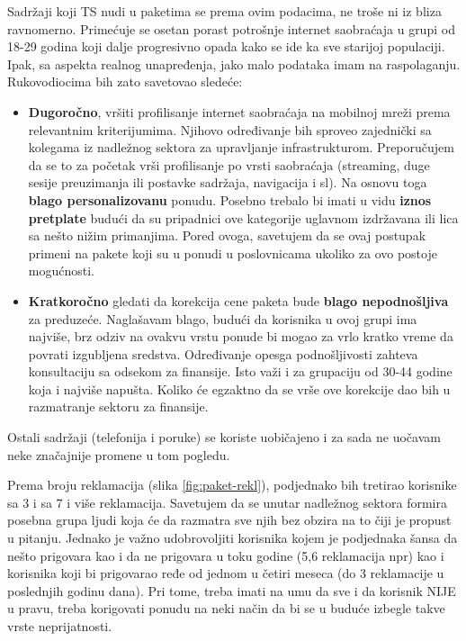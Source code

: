 \documentclass[a4paper,12pt]{article}
\begin{document}
    Sadržaji koji TS nudi u paketima se prema ovim podacima, ne troše ni iz bliza ravnomerno. Primećuje se osetan porast potrošnje internet saobraćaja u grupi od 18-29
    godina koji dalje progresivno opada kako se ide ka sve starijoj populaciji. Ipak, sa aspekta realnog unapređenja, jako malo podataka imam na raspolaganju.
    Rukovodiocima bih zato savetovao sledeće:
    \begin{itemize}
        \item {\textbf{Dugoročno}, vršiti profilisanje internet saobraćaja na mobilnoj mreži prema relevantnim kriterijumima. Njihovo određivanje bih
        sproveo zajednički sa kolegama iz nadležnog sektora za upravljanje infrastrukturom. Preporučujem da se to za početak vrši
        profilisanje po vrsti saobraćaja (streaming, duge sesije preuzimanja ili postavke sadržaja, navigacija i sl). Na osnovu toga
        \textbf{blago personalizovanu} ponudu. Posebno trebalo bi imati u vidu \textbf{iznos pretplate} budući da su pripadnici ove kategorije
        uglavnom izdržavana ili lica sa nešto nižim primanjima. Pored ovoga, savetujem da se ovaj postupak primeni na pakete koji su u ponudi u poslovnicama ukoliko
        za ovo postoje mogućnosti. }
        \item {\textbf{Kratkoročno} gledati da korekcija cene paketa bude \textbf{blago nepodnošljiva} za preduzeće. Naglašavam blago, budući da korisnika u ovoj grupi
        ima najviše, brz odziv na ovakvu vrstu ponude bi mogao za vrlo kratko vreme da povrati izgubljena sredstva. Određivanje opesga podnošljivosti
        zahteva konsultaciju sa odsekom za finansije. Isto važi i za grupaciju od 30-44 godine koja i najviše napušta. Koliko će egzaktno da se vrše ove korekcije dao bih u razmatranje
        sektoru za finansije.}
    \end{itemize}

    Ostali sadržaji (telefonija i poruke) se koriste uobičajeno i za sada ne uočavam neke značajnije promene u tom pogledu.

    Prema broju reklamacija (slika \ref{fig:paket-rekl}), podjednako bih tretirao korisnike sa 3 i sa 7 i više reklamacija. Savetujem da se unutar nadležnog sektora
    formira posebna grupa ljudi koja će da razmatra sve njih bez obzira na to čiji je propust u pitanju. Jednako je važno udobrovoljiti korisnika
    kojem je podjednaka šansa da nešto prigovara kao i da ne prigovara u toku godine (5,6 reklamacija npr) kao i korisnika koji bi prigovarao
    ređe od jednom u četiri meseca (do 3 reklamacije u poslednjih godinu dana). Pri tome, treba imati na umu da sve i da korisnik NIJE
    u pravu, treba korigovati ponudu na neki način da bi se u buduće izbegle takve vrste neprijatnosti.
\end{document}
